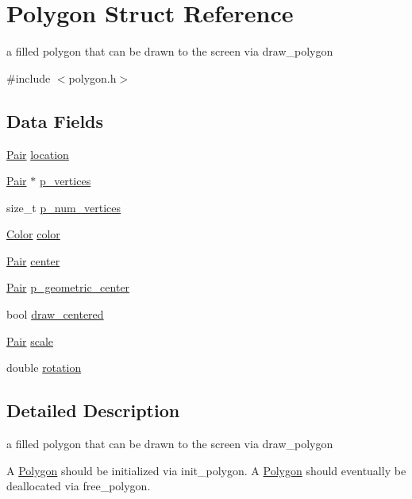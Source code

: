 \hypertarget{struct_polygon}{\section{Polygon Struct Reference}
\label{struct_polygon}
}


a filled polygon that can be drawn to the screen via draw\-\_\-polygon  




{\ttfamily \#include $<$polygon.\-h$>$}

\subsection*{Data Fields}
\begin{DoxyCompactItemize}
\item 
\hyperlink{struct_pair}{Pair} \hyperlink{struct_polygon_a843158366bab5a0ff1585eea6ae129c4}{location}
\item 
\hyperlink{struct_pair}{Pair} $\ast$ \hyperlink{struct_polygon_a96e84a65b6e342ef6b0d68d351e19ca3}{p\-\_\-vertices}
\item 
size\-\_\-t \hyperlink{struct_polygon_a02f4f16a791c3b5bdf6d5a8d1050d98f}{p\-\_\-num\-\_\-vertices}
\item 
\hyperlink{struct_color}{Color} \hyperlink{struct_polygon_af11748a279532cb7c86536c90d4bb98f}{color}
\item 
\hyperlink{struct_pair}{Pair} \hyperlink{struct_polygon_a69236fcce21e17cef1d2188784fbd62d}{center}
\item 
\hyperlink{struct_pair}{Pair} \hyperlink{struct_polygon_aa93cce3a1832a96829d43121993d6cc0}{p\-\_\-geometric\-\_\-center}
\item 
bool \hyperlink{struct_polygon_ac0f4e21df930834f025d2ee652486be2}{draw\-\_\-centered}
\item 
\hyperlink{struct_pair}{Pair} \hyperlink{struct_polygon_a5b1b549320c19673cf0355a79bde3f8f}{scale}
\item 
double \hyperlink{struct_polygon_a61a82f869dfde87b2e08f5c550b5f819}{rotation}
\end{DoxyCompactItemize}


\subsection{Detailed Description}
a filled polygon that can be drawn to the screen via draw\-\_\-polygon 

A \hyperlink{struct_polygon}{Polygon} should be initialized via init\-\_\-polygon. A \hyperlink{struct_polygon}{Polygon} should eventually be deallocated via free\-\_\-polygon. 

